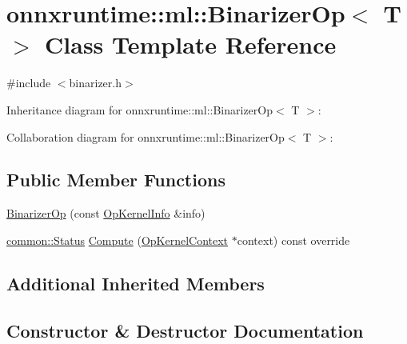 \hypertarget{classonnxruntime_1_1ml_1_1BinarizerOp}{}\section{onnxruntime\+:\+:ml\+:\+:Binarizer\+Op$<$ T $>$ Class Template Reference}
\label{classonnxruntime_1_1ml_1_1BinarizerOp}


{\ttfamily \#include $<$binarizer.\+h$>$}



Inheritance diagram for onnxruntime\+:\+:ml\+:\+:Binarizer\+Op$<$ T $>$\+:


Collaboration diagram for onnxruntime\+:\+:ml\+:\+:Binarizer\+Op$<$ T $>$\+:
\subsection*{Public Member Functions}
\begin{DoxyCompactItemize}
\item 
\mbox{\hyperlink{classonnxruntime_1_1ml_1_1BinarizerOp_a33295c6f77889ef9091a3e9849004464}{Binarizer\+Op}} (const \mbox{\hyperlink{classonnxruntime_1_1OpKernelInfo}{Op\+Kernel\+Info}} \&info)
\item 
\mbox{\hyperlink{classonnxruntime_1_1common_1_1Status}{common\+::\+Status}} \mbox{\hyperlink{classonnxruntime_1_1ml_1_1BinarizerOp_a8f77e3debad55252f404e0b390017ae4}{Compute}} (\mbox{\hyperlink{classonnxruntime_1_1OpKernelContext}{Op\+Kernel\+Context}} $\ast$context) const override
\end{DoxyCompactItemize}
\subsection*{Additional Inherited Members}


\subsection{Constructor \& Destructor Documentation}
\mbox{\label{classonnxruntime_1_1ml_1_1BinarizerOp_a33295c6f77889ef9091a3e9849004464}} 
